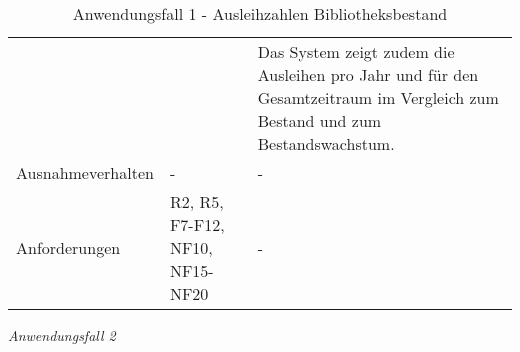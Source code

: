 \begin{table}[h]
\begin{adjustbox}{max width=\textwidth}
\begin{tabular}{lp{7.5cm}p{7.5cm}}
                                         & &Das System zeigt zudem die Ausleihen pro Jahr und für den Gesamtzeitraum im Vergleich zum Bestand und zum Bestandswachstum.\\
        Ausnahmeverhalten               &- &- \\
        Anforderungen                   &R2, R5, F7-F12, NF10, NF15-NF20& -\\ 
        \bottomrule
    \end{tabular}
    \end{adjustbox}
    \caption{%
    Anwendungsfall 1 - Ausleihzahlen Bibliotheksbestand
    }
    \label{tab:AF_Bibliotheksbestand}
    \end{table}
\endgroup




\newpage
\noindent
\textit{Anwendungsfall 2}


